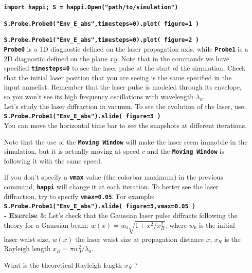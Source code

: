 \documentclass[a4paper,12pt]{extarticle}
\newcommand{\commandline}[1]{\texttt{\textbf{#1}}}
\begin{document}
\commandline{import happi; S =  happi.Open("path/to/simulation")}

\commandline{S.Probe.Probe0("Env\_E\_abs",timesteps=0).plot( figure=1 )}

\commandline{S.Probe.Probe1("Env\_E\_abs",timesteps=0).plot( figure=2 )}\\

\commandline{Probe0} is a 1D diagnostic defined on the laser propagation axis, while \commandline{Probe1} is a 2D diagnostic defined on the plane $xy$.  Note that in the commands we have specified \commandline{timesteps=0} to see the laser pulse at the start of the simulation. Check that the initial laser position that you are seeing is the same specified in the input namelist. Remember that the laser pulse is modeled through its envelope, so you won't see its high frequency oscillations with wavelength $\lambda_0$.\\

Let's study the laser diffraction in vacuum. To see the evolution of the laser, use:\\ 

\commandline{S.Probe.Probe1("Env\_E\_abs").slide( figure=3 )}\\

You can move the horizontal time bar to see the snapshots at different iterations.

Note that the use of the \commandline{Moving Window} will make the laser seem immobile in the simulation, but it is actually moving at speed $c$ and the \commandline{Moving Window} is following it with the same speed.

If you don't specify a \commandline{vmax} value (the colorbar maximum) in the previous command, \commandline{happi} will change it at each iteration. To better see the laser diffraction, try to specify \commandline{vmax=0.05}. For example:\\

\commandline{S.Probe.Probe1("Env\_E\_abs").slide( figure=3,vmax=0.05 )}\\

\textbf{ - Exercise  5:} Let's check that the Gaussian laser pulse diffracts following the theory for a Gaussian beam: $w(x)=w_0\sqrt{1+x^2/x_R^2}$, where $w_0$ is the initial laser waist size, $w(x)$ the laser waist size at propagation distance $x$, $x_R$ is the Rayleigh length $x_R=\pi w_0^2/\lambda_0$. 

What is the theoretical Rayleigh length $x_R$ ?\\
\end{document}
